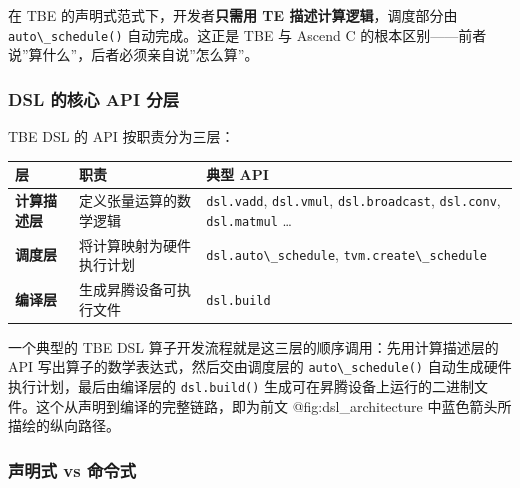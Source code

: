 在 TBE 的声明式范式下，开发者\textbf{只需用 TE 描述计算逻辑}，调度部分由
\passthrough{\lstinline!auto\_schedule()!} 自动完成。这正是 TBE 与
Ascend C 的根本区别------前者说''算什么''，后者必须亲自说''怎么算''。

\subsubsection{DSL 的核心 API 分层}\label{src-book-chapter7-h16}

TBE DSL 的 API 按职责分为三层：

\begin{longtable}[]{@{}
  >{\raggedright\arraybackslash}p{}
  >{\raggedright\arraybackslash}p{}
  >{\raggedright\arraybackslash}p{}@{}}
\toprule\noalign{}
\begin{minipage}[b]{\linewidth}\raggedright
层
\end{minipage} & \begin{minipage}[b]{\linewidth}\raggedright
职责
\end{minipage} & \begin{minipage}[b]{\linewidth}\raggedright
典型 API
\end{minipage} \\
\midrule\noalign{}
\endhead
\bottomrule\noalign{}
\endlastfoot
\textbf{计算描述层} & 定义张量运算的数学逻辑 &
\passthrough{\lstinline!dsl.vadd!}, \passthrough{\lstinline!dsl.vmul!},
\passthrough{\lstinline!dsl.broadcast!},
\passthrough{\lstinline!dsl.conv!}, \passthrough{\lstinline!dsl.matmul!}
\ldots{} \\
\textbf{调度层} & 将计算映射为硬件执行计划 &
\passthrough{\lstinline!dsl.auto\_schedule!},
\passthrough{\lstinline!tvm.create\_schedule!} \\
\textbf{编译层} & 生成昇腾设备可执行文件 &
\passthrough{\lstinline!dsl.build!} \\
\end{longtable}

一个典型的 TBE DSL 算子开发流程就是这三层的顺序调用：先用计算描述层的
API 写出算子的数学表达式，然后交由调度层的
\passthrough{\lstinline!auto\_schedule()!}
自动生成硬件执行计划，最后由编译层的
\passthrough{\lstinline!dsl.build()!}
生成可在昇腾设备上运行的二进制文件。这个从声明到编译的完整链路，即为前文
@fig:dsl\_architecture 中蓝色箭头所描绘的纵向路径。

\subsubsection{声明式 vs 命令式}\label{src-book-chapter7-h17}

